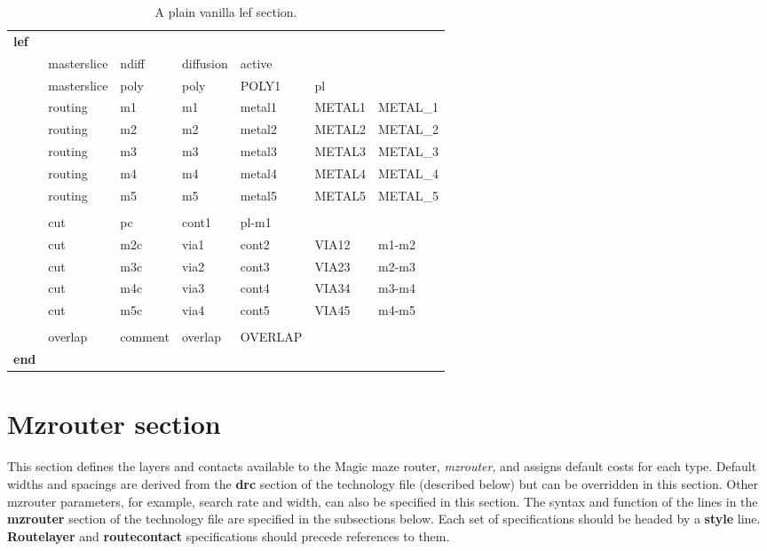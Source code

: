 \documentclass[letterpaper,twoside,12pt]{article}
\begin{document}
\begin{table}[ht]
   \begin{center}
      \begin{tabular}{|lllllll|} \hline
	  {\bfseries lef} &&&&&& \\
	  & masterslice & ndiff & diffusion & active && \\
	  & masterslice & poly & poly & POLY1 & pl & \\
	  & routing & m1 & m1 & metal1 & METAL1 & METAL\_1 \\
	  & routing & m2 & m2 & metal2 & METAL2 & METAL\_2 \\
	  & routing & m3 & m3 & metal3 & METAL3 & METAL\_3 \\
	  & routing & m4 & m4 & metal4 & METAL4 & METAL\_4 \\
	  & routing & m5 & m5 & metal5 & METAL5 & METAL\_5 \\
	  &&&&&&\\
	  & cut & pc & cont1 & pl-m1 && \\
	  & cut & m2c & via1 & cont2 & VIA12 & m1-m2 \\
	  & cut & m3c & via2 & cont3 & VIA23 & m2-m3 \\
	  & cut & m4c & via3 & cont4 & VIA34 & m3-m4 \\
	  & cut & m5c & via4 & cont5 & VIA45 & m4-m5 \\
	  &&&&&& \\
	  & overlap & comment & overlap & OVERLAP && \\
	  {\bfseries end} &&&&&& \\ \hline
      \end{tabular}
      \caption{A plain vanilla lef section.}
      \label{lefdef}
   \end{center}
\end{table}

\section{Mzrouter section} \label{s_mzrouter}

This section defines the layers and contacts available to the Magic maze router, {\itshape mzrouter}, and assigns default costs for each type.  Default widths 
and spacings are
derived from the {\bfseries drc} section of the technology file (described below) 
but can be overridden in this 
section.  Other mzrouter parameters, for example, search rate and width, 
can also be specified in this section.  The syntax and function of the
lines in the {\bfseries mzrouter} section of the technology file 
are specified in the subsections below.  Each
set of specifications should be headed by a {\bfseries style} line.
{\bfseries Routelayer}
and {\bfseries routecontact} specifications should precede references to them.
\end{document}
